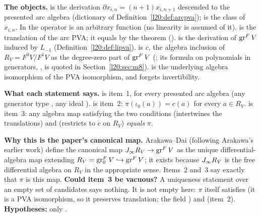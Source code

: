 \begin{dictionary}
\textbf{The objects.}  is the derivation $\partial x_{i,n}=(n+1)x_{i,n+1}$ descended to the
presented arc algebra (dictionary of Definition~\ref{l20:def:arcpva});  is the class of
$x_{i,n}$. In  the operator  is an arbitrary function (no linearity is assumed of
it).  is the translation of the arc PVA; it equals 
by the theorem  ().
 is the derivation of $\operatorname{gr}^F V$ induced by $L_{-1}$
(Definition~\ref{l20:def:lipva}).  is $c$, the algebra inclusion of
$R_V=F^0V/F^1V$ as the degree-zero part of $\operatorname{gr}^F V$ (;
its formula on polynomials in generators, , is quoted in Section~\ref{l20:sec:m8}).
 is the underlying algebra isomorphism of the PVA isomorphism, and 
forgets invertibility.

\textbf{What each statement says.}  is item~1, for every presented arc algebra (any generator
type , any ideal ).  is item~2: $\pi(\iota_0(a))=c(a)$ for every $a\in R_V$.
 is item~3: any algebra map  satisfying the two conditions  (intertwines
the translations) and  (restricts to $c$ on $R_V$) \emph{equals} $\pi$.

\textbf{Why this is the paper's canonical map.} Arakawa--Dai (following Arakawa's earlier work) define the canonical map
$J_\infty R_V\to\operatorname{gr}^F V$ as the unique differential-algebra map extending $R_V=\operatorname{gr}^F_0V\hookrightarrow\operatorname{gr}^F V$;
it exists because $J_\infty R_V$ is the free differential algebra on $R_V$ in the appropriate sense. Items~2 and~3 say exactly
that $\pi$ is this map. \textbf{Could item~3 be vacuous?} A uniqueness statement over an empty set of candidates says nothing.
It is not empty here: $\pi$ itself satisfies  (it is a PVA isomorphism, so it preserves translation; the field
) and  (item~2). \textbf{Hypotheses:} only .
\end{dictionary}

